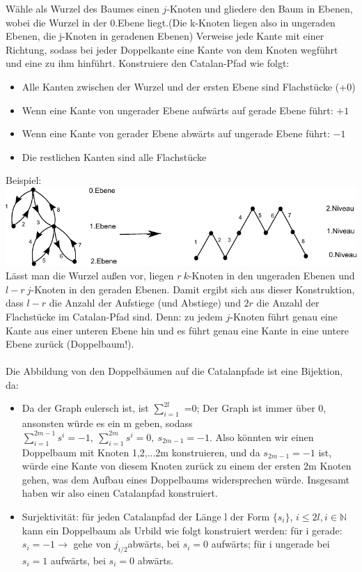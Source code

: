 \documentclass[a4paper, 11pt]{scrreprt}
\newenvironment{beweis}[1][Beweis]{\begin{trivlist}
	\item[\hskip \labelsep {\bfseries #1}]}
	{\end{trivlist}}
\newcommand{\NN}{\mathbb{N}}
\begin{document}
\begin{beweis}
Wähle als Wurzel des Baumes einen \(j\)-Knoten und gliedere den Baum in Ebenen, wobei die Wurzel in der 0.Ebene liegt.(Die k-Knoten liegen also in ungeraden Ebenen, die j-Knoten in geradenen Ebenen) Verweise jede Kante mit einer Richtung, sodass bei jeder Doppelkante eine Kante von dem Knoten wegführt und eine zu ihm hinführt. Konstruiere den Catalan-Pfad wie folgt:\\
\begin{itemize}
	\item Alle Kanten zwischen der Wurzel und der ersten Ebene sind Flachstücke (+0)
	\item Wenn eine Kante von ungerader Ebene aufwärts auf gerade Ebene führt: \(+1\)
	\item Wenn eine Kante von gerader Ebene abwärts auf ungerade Ebene führt: \(-1\)
	\item Die restlichen Kanten sind alle Flachstücke
\end{itemize}
Beispiel: \\
\includegraphics{Catalan-Pfad}
Lässt man die Wurzel außen vor, liegen \(r\ k\)-Knoten in den ungeraden Ebenen und \(l-r\ j\)-Knoten in den geraden Ebenen. Damit ergibt sich aus dieser Konstruktion, dass \(l-r\) die Anzahl der Aufstiege (und Abstiege) und \(2r\) die Anzahl der Flachstücke im Catalan-Pfad sind.  Denn: zu jedem \(j\)-Knoten führt genau eine Kante aus einer unteren Ebene hin und es führt genau eine Kante in eine untere Ebene zurück (Doppelbaum!). \\
\\ Die Abbildung von den Doppelbäumen auf die Catalanpfade ist eine Bijektion, da:
\begin{itemize}
 \item[•]Da der Graph eulersch ist, ist $ \sum_{i=1}^{2l} $ =0; Der Graph ist immer über 0, ansonsten würde es ein m geben, sodass $ \sum_{i=1}^{2m-1}s^{i}=-1, ~\sum_{i=1}^{2m}s^{i}=0, ~ s_{2m-1}=-1  $. Also könnten wir einen Doppelbaum mit Knoten {1,2,...2m} konstruieren, und da $ s_{2m-1}=-1  $ ist, würde eine Kante von diesem Knoten zurück zu einem der ersten 2m Knoten gehen, was dem Aufbau eines Doppelbaums widersprechen würde. Insgesamt haben wir also einen Catalanpfad konstruiert. 
 \item[•] Surjektivität:  für jeden Catalanpfad der Länge l der Form $\lbrace s_{i} \rbrace$, $ i \leq 2l, i \in \NN $ kann ein Doppelbaum als Urbild wie folgt konstruiert werden: für i gerade: $s_{i}=-1 \rightarrow $ gehe von $j_{i/2}$abwärts, bei $s_{i}=0  $ aufwärts; für i ungerade bei $s_{i}=1 $ aufwärts, bei $s_{i}=0 $ abwärts. 

\end{itemize}
\end{beweis}
\end{document}
